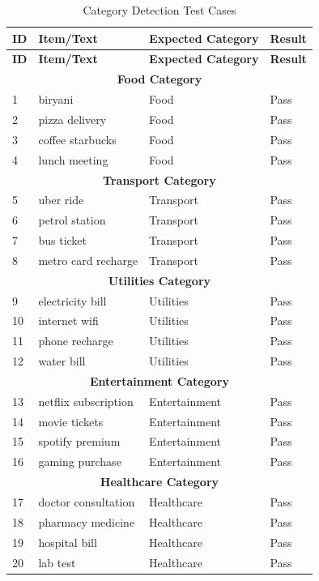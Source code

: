 \begin{longtable}{|p{0.5cm}|p{4cm}|p{4cm}|p{3cm}|}
\caption{Category Detection Test Cases} \label{tab:category-tests} \\
\hline
\textbf{ID} & \textbf{Item/Text} & \textbf{Expected Category} & \textbf{Result} \\
\hline
\endfirsthead
\hline
\textbf{ID} & \textbf{Item/Text} & \textbf{Expected Category} & \textbf{Result} \\
\hline
\endhead

\multicolumn{4}{c}{\textbf{Food Category}} \\
\hline
1 & biryani & Food & Pass \\
\hline
2 & pizza delivery & Food & Pass \\
\hline
3 & coffee starbucks & Food & Pass \\
\hline
4 & lunch meeting & Food & Pass \\
\hline

\multicolumn{4}{c}{\textbf{Transport Category}} \\
\hline
5 & uber ride & Transport & Pass \\
\hline
6 & petrol station & Transport & Pass \\
\hline
7 & bus ticket & Transport & Pass \\
\hline
8 & metro card recharge & Transport & Pass \\
\hline

\multicolumn{4}{c}{\textbf{Utilities Category}} \\
\hline
9 & electricity bill & Utilities & Pass \\
\hline
10 & internet wifi & Utilities & Pass \\
\hline
11 & phone recharge & Utilities & Pass \\
\hline
12 & water bill & Utilities & Pass \\
\hline

\multicolumn{4}{c}{\textbf{Entertainment Category}} \\
\hline
13 & netflix subscription & Entertainment & Pass \\
\hline
14 & movie tickets & Entertainment & Pass \\
\hline
15 & spotify premium & Entertainment & Pass \\
\hline
16 & gaming purchase & Entertainment & Pass \\
\hline

\multicolumn{4}{c}{\textbf{Healthcare Category}} \\
\hline
17 & doctor consultation & Healthcare & Pass \\
\hline
18 & pharmacy medicine & Healthcare & Pass \\
\hline
19 & hospital bill & Healthcare & Pass \\
\hline
20 & lab test & Healthcare & Pass \\
\hline

\end{longtable}

